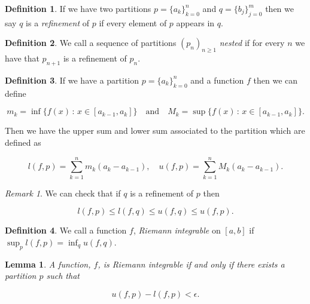 \documentclass[
]{book}
\newtheorem{lemma}{Lemma}[chapter]
\theoremstyle{definition}
\newtheorem{definition}{Definition}[chapter]
\theoremstyle{definition}
\theoremstyle{definition}
\theoremstyle{definition}
\theoremstyle{remark}
\newtheorem*{remark}{Remark}
\begin{document}
\begin{definition}
If we have two partitions \(p = \{a_k\}_{k=0}^n\) and \(q=\{b_j\}_{j=0}^m\) then we say \(q\) is a \emph{refinement} of \(p\) if every element of \(p\) appears in \(q\).
\end{definition}

\begin{definition}
We call a sequence of partitions \((p_n)_{n \geq 1}\) \emph{nested} if for every \(n\) we have that \(p_{n+1}\) is a refinement of \(p_n\).
\end{definition}

\begin{definition}
If we have a partition \(p = \{a_k\}_{k=0}^n\) and a function \(f\) then we can define

\[ m_k = \inf \{ f(x) \,:\, x \in [a_{k-1},a_k] \} \quad \mbox{and}\quad M_k = \sup\{ f(x)\,:\, x \in [a_{k-1},a_k]\}. \]

Then we have the upper sum and lower sum associated to the partition which are defined as

\[ l(f,p) = \sum_{k=1}^n m_k(a_k-a_{k-1}), \quad u(f,p) = \sum_{k=1}^n M_k (a_k-a_{k-1}). \]
\end{definition}

\begin{remark}
We can check that if \(q\) is a refinement of \(p\) then

\[ l(f,p) \leq l(f,q) \leq u(f,q) \leq u(f,p). \]
\end{remark}

\begin{definition}
We call a function \(f\), \emph{Riemann integrable} on \([a,b]\) if \(\sup_p l(f,p) = \inf_q u(f,q)\).
\end{definition}

\begin{lemma}
A function, \(f\), is Riemann integrable if and only if there exists a partition \(p\) such that

\[ u(f,p) - l(f,p) < \epsilon. \]
\end{lemma}
\end{document}
